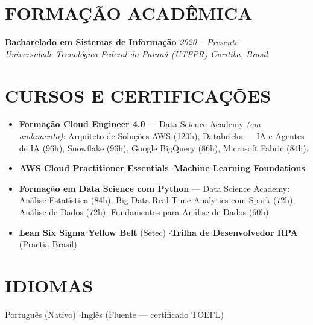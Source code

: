 \documentclass[11pt,a4paper]{article}
\begin{document}
\section{FORMAÇÃO ACADÊMICA}
\noindent
\textbf{Bacharelado em Sistemas de Informação} \hfill \textit{2020 -- Presente} \\
\textit{Universidade Tecnológica Federal do Paraná (UTFPR)} \hfill \textit{Curitiba, Brasil}

\section{CURSOS E CERTIFICAÇÕES}
\begin{itemize}
    \item \textbf{Formação Cloud Engineer 4.0} --- Data Science Academy \textit{(em andamento)}: Arquiteto de Soluções AWS (120h), Databricks --- IA e Agentes de IA (96h), Snowflake (96h), Google BigQuery (86h), Microsoft Fabric (84h).
    \item \textbf{AWS Cloud Practitioner Essentials} \enspace$\cdot$\enspace \textbf{Machine Learning Foundations}
    \item \textbf{Formação em Data Science com Python} --- Data Science Academy: Análise Estatística (84h), Big Data Real-Time Analytics com Spark (72h), Análise de Dados (72h), Fundamentos para Análise de Dados (60h).
    \item \textbf{Lean Six Sigma Yellow Belt} (Setec) \enspace$\cdot$\enspace \textbf{Trilha de Desenvolvedor RPA} (Practia Brasil)
\end{itemize}

\section{IDIOMAS}
\noindent Português (Nativo) \enspace$\cdot$\enspace Inglês (Fluente --- certificado TOEFL)
\end{document}
